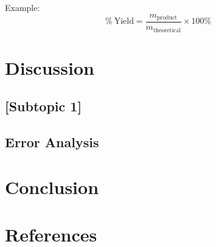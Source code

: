 \documentclass[
	10pt,
	twocolumn,
	letterpaper,
]{article}
\begin{document}
Example:
\begin{equation}
	\%\ \text{Yield} = \frac{m_{\text{product}}}{m_{\text{theoretical}}} \times 100\%
	\label{eq:yield}
\end{equation}

\section{Discussion}



\subsection{[Subtopic 1]}


\subsection{Error Analysis}


\section{Conclusion}


\section*{References}

\printbibliography[heading=none]

\balance
\end{document}
